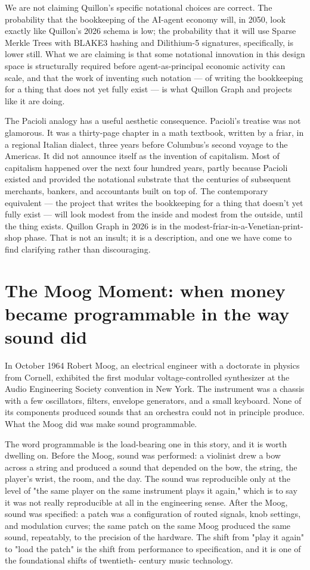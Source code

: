 \documentclass[11pt,a4paper]{article}
\begin{document}
We are not claiming Quillon's specific notational choices are correct.
The probability that the bookkeeping of the AI-agent economy will, in
2050, look exactly like Quillon's 2026 schema is low; the probability
that it will use Sparse Merkle Trees with BLAKE3 hashing and Dilithium-5
signatures, specifically, is lower still. What we are claiming is that
some notational innovation in this design space is structurally required
before agent-as-principal economic activity can scale, and that the work
of inventing such notation --- of writing the bookkeeping for a thing
that does not yet fully exist --- is what Quillon Graph and projects
like it are doing.

The Pacioli analogy has a useful aesthetic consequence. Pacioli's
treatise was not glamorous. It was a thirty-page chapter in a math
textbook, written by a friar, in a regional Italian dialect, three years
before Columbus's second voyage to the Americas. It did not announce
itself as the invention of capitalism. Most of capitalism happened over
the next four hundred years, partly because Pacioli existed and provided
the notational substrate that the centuries of subsequent merchants,
bankers, and accountants built on top of. The contemporary equivalent
--- the project that writes the bookkeeping for a thing that doesn't yet
fully exist --- will look modest from the inside and modest from the
outside, until the thing exists. Quillon Graph in 2026 is in the
modest-friar-in-a-Venetian-print-shop phase. That is not an insult; it
is a description, and one we have come to find clarifying rather than
discouraging.

\section{The Moog Moment: when money became programmable in the way sound did}\label{sec:moog}

In October 1964 Robert Moog, an electrical engineer with a doctorate in
physics from Cornell, exhibited the first modular voltage-controlled
synthesizer at the Audio Engineering Society convention in New York. The
instrument was a chassis with a few oscillators, filters, envelope
generators, and a small keyboard. None of its components produced sounds
that an orchestra could not in principle produce. What the Moog did was
make sound programmable.

The word programmable is the load-bearing one in this story, and it is
worth dwelling on. Before the Moog, sound was performed: a violinist
drew a bow across a string and produced a sound that depended on the
bow, the string, the player's wrist, the room, and the day. The sound
was reproducible only at the level of "the same player on the same
instrument plays it again," which is to say it was not really
reproducible at all in the engineering sense. After the Moog, sound was
specified: a patch was a configuration of routed signals, knob settings,
and modulation curves; the same patch on the same Moog produced the same
sound, repeatably, to the precision of the hardware. The shift from
"play it again" to "load the patch" is the shift from performance to
specification, and it is one of the foundational shifts of twentieth-
century music technology.
\end{document}
